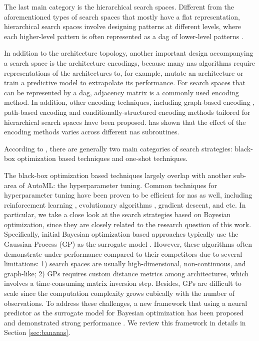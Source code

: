\documentclass[a4paper,oneside,bibliography=totoc]{scrbook}
\begin{document}
\begin{description}[leftmargin=0cm, listparindent=\parindent]
		The last main category is the hierarchical search spaces. Different from the aforementioned types of search spaces that mostly have a flat representation, hierarchical search spaces involve designing patterns at different levels, where each higher-level pattern is often represented as a \gls{dag} of lower-level patterns \cite{christoforidis2021novel, liu2018hierarchical}.
		
	In addition to the architecture topology, another important design accompanying a search space is the architecture encodings, because  many \gls{nas} algorithms require representations of the architectures to, for example, mutate an architecture or train a predictive model to extrapolate its performance. For search spaces that can be represented by a \gls{dag}, adjacency matrix is a commonly used encoding method. In addition, other encoding techniques, including graph-based encoding \cite{ning2020generic}, path-based encoding \cite{white2019bananas} and conditionally-structured encoding methods tailored for hierarchical search spaces have been proposed. \cite{white2020study} has shown that the effect of the encoding methods varies across different \gls{nas} subroutines.	
	  
	\item [Search Strategy] According to \cite{white2023survey}, there are generally two main categories of search strategies: black-box optimization based techniques and one-shot techniques. 
	 
		The black-box optimization based techniques largely overlap with another sub-area of AutoML: the hyperparameter tuning. Common techniques for hyperparameter tuning have been proven to be efficient for \gls{nas} as well, including reinforcement learning \cite{zoph2017neural, zoph2018learning}, evolutionary algorithms \cite{maziarz2018evo-nas,  real2019regularized}, gradient descent\cite{liu2018darts}, and etc. In particular, we take a close look at the search strategies based on Bayesian optimization, since they are closely related to the research question of this work. Specifically, initial Bayesian optimization based approaches typically use the Gaussian Process (GP) as the surrogate model \cite{kandasamy2018neural}. However, these algorithms often demonstrate under-performance compared to their competitors due to several limitations: 1) search spaces are usually high-dimensional, non-continuous, and graph-like; 2) GPs requires custom distance metrics among architectures, which involves a time-consuming matrix inversion step. Besides, GPs are difficult to scale since the computation complexity grows cubically with the number of observations. To address these challenges, a new framework that using a neural predictor as the surrogate model for Bayesian optimization has been proposed and demonstrated strong performance \cite{ma2019deep, springenberg2016bayesian, white2019bananas}. We review this framework in details in Section \ref{sec:bananas}.
		

\end{description}
\end{document}
